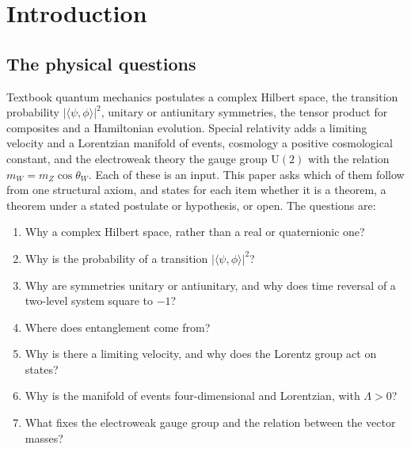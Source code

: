 \documentclass[aps,pra,onecolumn,superscriptaddress,nofootinbib,10pt]{revtex4-2}
\theoremstyle{definition}
\theoremstyle{remark}
\newcommand{\ip}[2]{\langle #1,#2\rangle}
\newcommand{\U}{\mathrm{U}}
\begin{document}
\maketitle

\section{Introduction}\label{sec:intro}

\subsection{The physical questions}
Textbook quantum mechanics postulates a complex Hilbert space, the transition probability
$\lvert\ip{\psi}{\phi}\rvert^2$, unitary or antiunitary symmetries, the tensor product for composites
and a Hamiltonian evolution.  Special relativity adds a limiting velocity and a Lorentzian manifold
of events, cosmology a positive cosmological constant, and the electroweak theory the gauge group
$\U(2)$ with the relation $m_W=m_Z\cos\theta_W$.  Each of these is an input.  This paper asks which of
them follow from one structural axiom, and states for each item whether it is a theorem, a theorem
under a stated postulate or hypothesis, or open.  The questions are:
\begin{enumerate}[label=(Q\arabic*),leftmargin=3em]
\item Why a complex Hilbert space, rather than a real or quaternionic one?
\item Why is the probability of a transition $\lvert\ip{\psi}{\phi}\rvert^2$?
\item Why are symmetries unitary or antiunitary, and why does time reversal of a two-level system
square to $-1$?
\item Where does entanglement come from?
\item Why is there a limiting velocity, and why does the Lorentz group act on states?
\item Why is the manifold of events four-dimensional and Lorentzian, with $\Lambda>0$?
\item What fixes the electroweak gauge group and the relation between the vector masses?
\end{enumerate}
\end{document}
